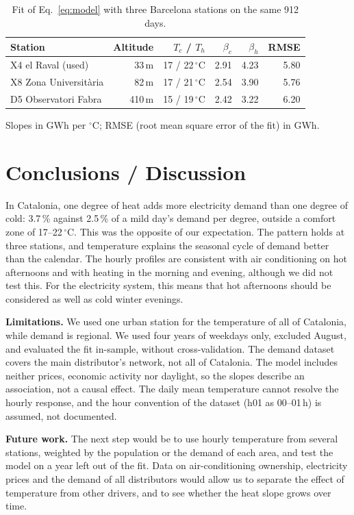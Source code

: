 \documentclass[
  journal=small,
  manuscript=mini-article,  %
  year=2026,
  volume=1,
]{odj-journal}
\begin{document}
\begin{table}[hbt!]
\begin{threeparttable}
\caption{Fit of Eq.~\eqref{eq:model} with three Barcelona stations on the same 912 days.}
\label{tab:stations}
\begin{tabular}{lrrrrr}
\toprule
\headrow Station & Altitude & $T_c$ / $T_h$ & $\beta_c$ & $\beta_h$ & RMSE\\
\midrule
X4 el Raval (used) & 33\,m & 17 / 22\,$^\circ$C & 2.91 & 4.23 & 5.80\\
X8 Zona Universit\`aria & 82\,m & 17 / 21\,$^\circ$C & 2.54 & 3.90 & 5.76\\
D5 Observatori Fabra & 410\,m & 15 / 19\,$^\circ$C & 2.42 & 3.22 & 6.20\\
\bottomrule
\end{tabular}
\begin{tablenotes}[hang]
\item[]Slopes in GWh per $^\circ$C; RMSE (root mean square error of the fit) in GWh.
\end{tablenotes}
\end{threeparttable}
\end{table}

\section{Conclusions / Discussion}

In Catalonia, one degree of heat adds more electricity demand than one degree of cold: 3.7\,\% against 2.5\,\% of a mild day's demand per degree, outside a comfort zone of 17--22\,$^\circ$C. This was the opposite of our expectation. The pattern holds at three stations, and temperature explains the seasonal cycle of demand better than the calendar. The hourly profiles are consistent with air conditioning on hot afternoons and with heating in the morning and evening, although we did not test this. For the electricity system, this means that hot afternoons should be considered as well as cold winter evenings.

\textbf{Limitations.} We used one urban station for the temperature of all of Catalonia, while demand is regional. We used four years of weekdays only, excluded August, and evaluated the fit in-sample, without cross-validation. The demand dataset covers the main distributor's network, not all of Catalonia. The model includes neither prices, economic activity nor daylight, so the slopes describe an association, not a causal effect. The daily mean temperature cannot resolve the hourly response, and the hour convention of the dataset (h01 as 00--01\,h) is assumed, not documented.

\textbf{Future work.} The next step would be to use hourly temperature from several stations, weighted by the population or the demand of each area, and test the model on a year left out of the fit. Data on air-conditioning ownership, electricity prices and the demand of all distributors would allow us to separate the effect of temperature from other drivers, and to see whether the heat slope grows over time.



\end{document}
